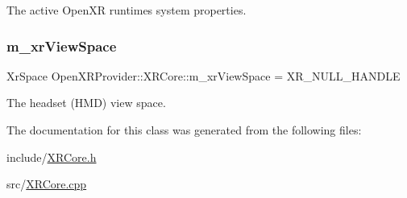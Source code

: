 The active Open\+XR runtime\textquotesingle{}s system properties. 

\mbox{\label{class_open_x_r_provider_1_1_x_r_core_aedd9482e56c69a607c0c6aa8b0b2ab0b}} 
\subsubsection{\texorpdfstring{m\_xrViewSpace}{m\_xrViewSpace}}
{\footnotesize\ttfamily Xr\+Space Open\+X\+R\+Provider\+::\+X\+R\+Core\+::m\+\_\+xr\+View\+Space = X\+R\+\_\+\+N\+U\+L\+L\+\_\+\+H\+A\+N\+D\+LE\hspace{0.3cm}{\ttfamily [private]}}



The headset (H\+MD) view space. 



The documentation for this class was generated from the following files\+:\begin{DoxyCompactItemize}
\item 
include/\mbox{\hyperlink{_x_r_core_8h}{X\+R\+Core.\+h}}\item 
src/\mbox{\hyperlink{_x_r_core_8cpp}{X\+R\+Core.\+cpp}}\end{DoxyCompactItemize}

